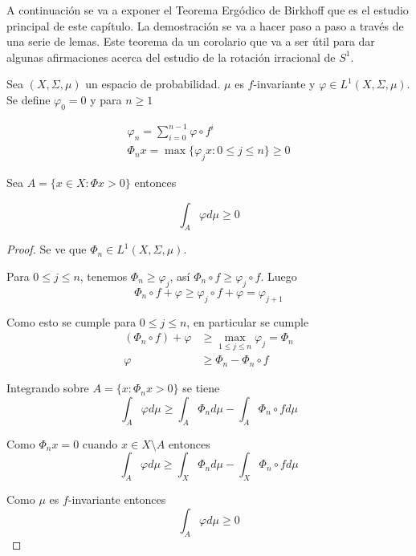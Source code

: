 A continuación se va a exponer el Teorema Ergódico de Birkhoff que es el estudio principal de este capítulo. La demostración se va a hacer paso a paso a través de una serie de lemas. Este teorema da un corolario que va a ser útil para dar algunas afirmaciones acerca del estudio de la rotación irracional de $S^1$.

\begin{lema}\label{maxima_desigualdad}
	Sea $(X,\Sigma,\mu)$ un espacio de probabilidad. $\mu$ es $f$-invariante y $\varphi \in L^1(X,\Sigma,\mu)$. Se define $\varphi_0 = 0$ y para $n \geq 1$
	
	\begin{gather}
		\varphi_n = \sum_{i=0}^{n-1} \varphi \circ f^i\\
		\varPhi_n x = \max \{\varphi_j x : 0 \leq j \leq n\} \geq 0
	\end{gather}
	
	Sea $A = \{x \in X: \varPhi x > 0 \}$ entonces

	\begin{equation}
		\int_A \varphi d\mu \geq 0
	\end{equation}
\end{lema}

\begin{proof}
	Se ve que $\varPhi_n \in L^1(X,\Sigma,\mu)$. 
	
	Para $0 \leq j \leq n$, tenemos $\varPhi_n \geq \varphi_j$, así $\varPhi_n \circ f \geq \varphi_j \circ f$. Luego
	\begin{equation}
		\varPhi_n \circ f + \varphi \geq \varphi_j \circ f + \varphi = \varphi_{j+1}
	\end{equation}
	
	Como esto se cumple para $0 \leq j \leq n$, en particular se cumple
	\begin{align}
		(\varPhi_n \circ f)  + \varphi  &\geq \max_{1 \leq j \leq n} \varphi_j  = \varPhi_n\\
		\varphi &\geq \varPhi_n - \varPhi_n \circ f 
	\end{align}
	
	Integrando sobre $A= \{x: \varPhi_n x > 0\}$ se tiene
	\begin{equation}
		\int_A \varphi d\mu \geq \int_A \varPhi_n d\mu - \int_A \varPhi_n \circ f d\mu
	\end{equation}
	
	Como $\varPhi_n x = 0$ cuando $x \in X \setminus A$ entonces
	\begin{equation}
		\int_A \varphi d\mu \geq \int_X \varPhi_n d\mu - \int_X \varPhi_n \circ f d\mu
	\end{equation}
	
	Como $\mu$ es $f$-invariante entonces
	\begin{equation}
		\int_A \varphi d\mu \geq 0
	\end{equation}
\end{proof}

